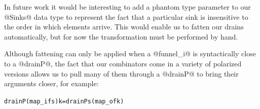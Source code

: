 In future work it would be interesting to add a phantom type parameter to our @Sinks@ data type to represent the fact that a particular sink is insensitive to the order in which elements arrive. This would enable us to fatten our drains automatically, but for now the transformation must be performed by hand.

Although fattening can only be applied when a @funnel_i@ is syntactically close to a @drainP@, the fact that our combinators come in a variety of polarized versions allows us to pull many of them through a @drainP@ to bring their arguments closer, for example:
\begin{alltt}
  drainP (map_i f s) k  =  drainP s (map_o f k)
\end{alltt}


\eject

